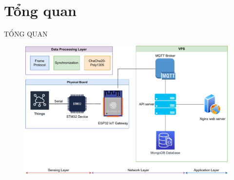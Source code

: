 \section{Tổng quan}

\begin{frame}{TỔNG QUAN}
	\begin{figure}[htbp]
		\centering
		\includegraphics[width=1.0\linewidth,height=.85\textheight]{pic/Presentation-Page-1-System-Overview.pdf}
	\end{figure}
\end{frame}